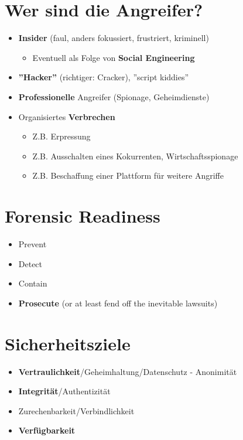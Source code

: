 \documentclass[openany]{book}
\begin{document}
\section{Wer sind die Angreifer?}

\begin{itemize}
\item \textbf{Insider} (faul, anders fokussiert, frustriert, kriminell)
\begin{itemize}
\item Eventuell als Folge von \textbf{Social Engineering}
\end{itemize}
\item \textbf{''Hacker''} (richtiger: Cracker), ''script kiddies''
\item \textbf{Professionelle} Angreifer (Spionage, Geheimdienste)
\item Organisiertes \textbf{Verbrechen}
\begin{itemize}
\item Z.B. Erpressung
\item Z.B. Ausschalten eines Kokurrenten, Wirtschaftsspionage
\item Z.B. Beschaffung einer Plattform für weitere Angriffe
\end{itemize}
\end{itemize}

\section{Forensic Readiness}

\begin{itemize}
\item Prevent
\item Detect
\item Contain
\item \textbf{Prosecute} (or at least fend off the inevitable lawsuits)
\end{itemize}

\section{Sicherheitsziele}

\begin{itemize}
\item \textbf{Vertraulichkeit}/Geheimhaltung/Datenschutz - Anonimität
\item \textbf{Integrität}/Authentizität
\item Zurechenbarkeit/Verbindlichkeit
\item \textbf{Verfügbarkeit}
\end{itemize}
\end{document}
